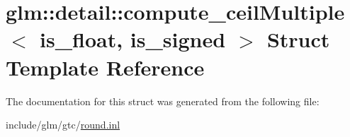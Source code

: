 \hypertarget{structglm_1_1detail_1_1compute__ceilMultiple}{}\section{glm\+:\+:detail\+:\+:compute\+\_\+ceil\+Multiple$<$ is\+\_\+float, is\+\_\+signed $>$ Struct Template Reference}
\label{structglm_1_1detail_1_1compute__ceilMultiple}


The documentation for this struct was generated from the following file\+:\begin{DoxyCompactItemize}
\item 
include/glm/gtc/\hyperlink{round_8inl}{round.\+inl}\end{DoxyCompactItemize}
